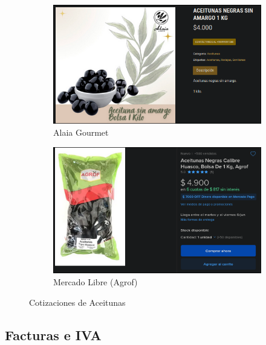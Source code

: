 \documentclass[12pt]{article}
\begin{document}
    \begin{figure}[H]
        \centering
        \begin{subfigure}{0.48\textwidth}
            \centering
            \includegraphics[width=\linewidth]{gourmet} %
            \caption{Alaia Gourmet}
            \label{fig:alaia_gourmet_aceitunas}
        \end{subfigure}
        \hfill
        \begin{subfigure}{0.48\textwidth}
            \centering
            \includegraphics[width=\linewidth]{libre} %
            \caption{Mercado Libre (Agrof)}
            \label{fig:mercado_libre_aceitunas}
        \end{subfigure}
        \caption{Cotizaciones de Aceitunas}
        \label{fig:cotizaciones_aceitunas}
    \end{figure}

\subsection{Facturas e IVA}
\end{document}
